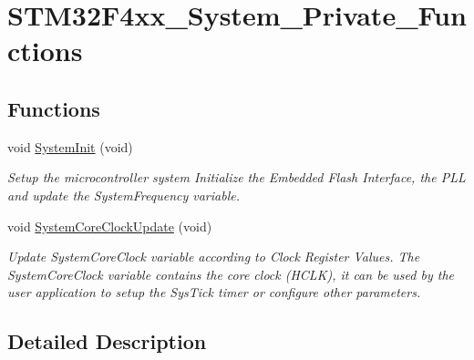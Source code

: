 \hypertarget{group___s_t_m32_f4xx___system___private___functions}{\section{S\-T\-M32\-F4xx\-\_\-\-System\-\_\-\-Private\-\_\-\-Functions}
\label{group___s_t_m32_f4xx___system___private___functions}
}
\subsection*{Functions}
\begin{DoxyCompactItemize}
\item 
void \hyperlink{group___s_t_m32_f4xx___system___private___functions_ga93f514700ccf00d08dbdcff7f1224eb2}{System\-Init} (void)
\begin{DoxyCompactList}\small\item\em Setup the microcontroller system Initialize the Embedded Flash Interface, the P\-L\-L and update the System\-Frequency variable. \end{DoxyCompactList}\item 
void \hyperlink{group___s_t_m32_f4xx___system___private___functions_gae0c36a9591fe6e9c45ecb21a794f0f0f}{System\-Core\-Clock\-Update} (void)
\begin{DoxyCompactList}\small\item\em Update System\-Core\-Clock variable according to Clock Register Values. The System\-Core\-Clock variable contains the core clock (H\-C\-L\-K), it can be used by the user application to setup the Sys\-Tick timer or configure other parameters. \end{DoxyCompactList}\end{DoxyCompactItemize}


\subsection{Detailed Description}



